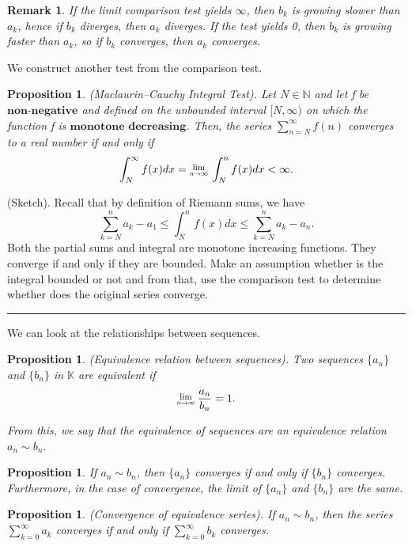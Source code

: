 \documentclass[twoside]{article}
\newcommand{\Lim}[1]{\raisebox{0.5ex}{\scalebox{0.8}{$\displaystyle \lim_{#1}\;$}}}
\newtheorem{proposition}[theorem]{Proposition}
\newtheorem{remark}[theorem]{Remark}
\newenvironment{proof}{{\bf Proof:}}{\hfill\rule{2mm}{2mm}}
\begin{document}
\begin{remark}
If the limit comparison test yields $\infty$, then $b_k$ is growing slower than $a_k$, hence if $b_k$ diverges, then $a_k$ diverges. If the test yields 0, then $b_k$ is growing faster than $a_k$, so if $b_k$ converges, then $a_k$ converges.
\end{remark}

We construct another test from the comparison test.


\begin{proposition}(Maclaurin–Cauchy Integral Test). Let $N \in \mathbb{N}$ and let f be $\textbf{non-negative}$ and defined on the unbounded interval $[N, \infty)$ on which the function f is $\textbf{monotone decreasing}$. Then, the series $\sum_{n=N}^{\infty}f(n)$ converges to a real number if and only if 
$$
\int_N^{\infty}f(x)dx = \Lim{n \rightarrow \infty}\int_N^nf(x)dx < \infty.
$$
\end{proposition}

\begin{proof}(Sketch). Recall that by definition of Riemann sums, we have
$$
\sum_{k=N}^na_k - a_1 \leq \int_N^nf(x)dx \leq \sum_{k=N}^na_k - a_n.
$$
Both the partial sums and integral are monotone increasing functions. They converge if and only if they are bounded. Make an assumption whether is the integral bounded or not and from that, use the comparison test to determine whether does the original series converge.
\end{proof}

We can look at the relationships between sequences. 

\begin{proposition}(Equivalence relation between sequences). Two sequences $\{a_n\}$ and $\{b_n\}$ in $\mathbb{K}$ are equivalent if
$$
\Lim{n \rightarrow \infty}\frac{a_n}{b_n} = 1.
$$

From this, we say that the equivalence of sequences are an equivalence relation $a_n \sim b_n$.
\end{proposition}

\begin{proposition} If $a_n \sim b_n$, then $\{a_n\}$ converges if and only if $\{b_n\}$ converges. Furthermore, in the case of convergence, the limit of $\{a_n\}$ and $\{b_n\}$ are the same.
\end{proposition}

\begin{proposition}(Convergence of equivalence series). If $a_n \sim b_n$, then the series $\sum_{k=0}^{\infty}a_k$ converges if and only if $\sum_{k=0}^{\infty}b_k$ converges.
\end{proposition}
\end{document}
